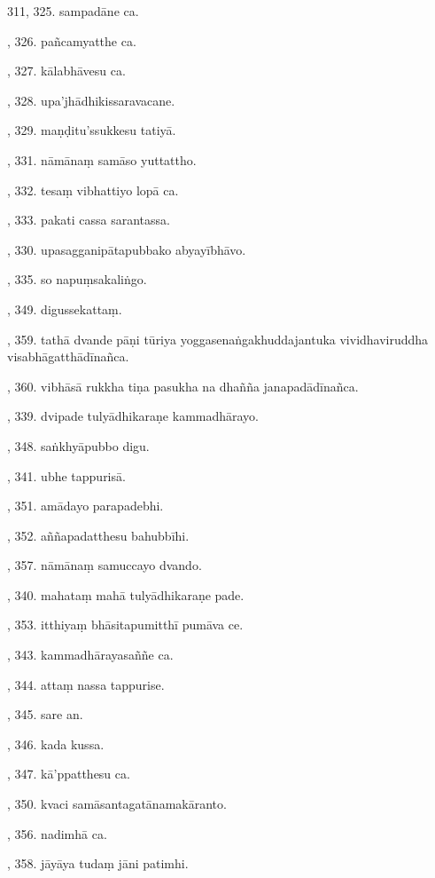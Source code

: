 311, 325. sampadāne ca.\par {}, 326. pañcamyatthe ca.\par {}, 327. kālabhāvesu ca.\par {}, 328. upa’jhādhikissaravacane.\par {}, 329. maṇḍitu’ssukkesu tatiyā.\par {}, 331. nāmānaṃ samāso yuttattho.\par {}, 332. tesaṃ vibhattiyo lopā ca.\par {}, 333. pakati cassa sarantassa.\par {}, 330. upasagganipātapubbako abyayībhāvo.\par {}, 335. so napuṃsakaliṅgo.\par {}, 349. digussekattaṃ.\par {}, 359. tathā dvande pāṇi tūriya yoggasenaṅgakhuddajantuka vividhaviruddha visabhāgatthādīnañca.\par {}, 360. vibhāsā rukkha tiṇa pasukha na dhañña janapadādīnañca.\par {}, 339. dvipade tulyādhikaraṇe kammadhārayo.\par {}, 348. saṅkhyāpubbo digu.\par {}, 341. ubhe tappurisā.\par {}, 351. amādayo parapadebhi.\par {}, 352. aññapadatthesu bahubbīhi.\par {}, 357. nāmānaṃ samuccayo dvando.\par {}, 340. mahataṃ mahā tulyādhikaraṇe pade.\par {}, 353. itthiyaṃ bhāsitapumitthī pumāva ce.\par {}, 343. kammadhārayasaññe ca.\par {}, 344. attaṃ nassa tappurise.\par {}, 345. sare an.\par {}, 346. kada kussa.\par {}, 347. kā’ppatthesu ca.\par {}, 350. kvaci samāsantagatānamakāranto.\par {}, 356. nadimhā ca.\par {}, 358. jāyāya tudaṃ jāni patimhi.\par \noindent
